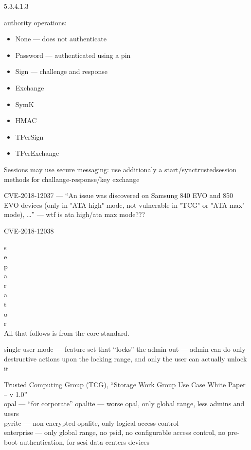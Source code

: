 \documentclass[
  digital, %
  oneside, %
  nolof,     %
  nolot,     %
]{fithesis4}
\begin{document}
5.3.4.1.3

authority operations: 
\begin{itemize}
    \item None --- does not authenticate
    \item Password --- authenticated using a pin
    \item Sign --- challenge and response
    \item Exchange
    \item SymK
    \item HMAC
    \item TPerSign
    \item TPerExchange
\end{itemize}

Sessions may use secure messaging: 
use additionaly a start/synctrustedsession methods for challange-response/key exchange

CVE-2018-12037  --- ``An issue was discovered on Samsung 840 EVO and 850 EVO devices (only in "ATA high" mode, not vulnerable in "TCG" or "ATA max" mode), \dots'' --- wtf is ata high/ata max mode???

CVE-2018-12038


s \\
e \\
p \\
a \\
r \\
a \\
t \\
o \\
r \\



All that follows is from the core standard\cite{tcg-storage-core}.


single user mode --- feature set that ``locks'' the admin out --- admin can do only destructive actions upon the locking range, and only the user can actually unlock it




Trusted Computing Group (TCG), “Storage Work Group Use Case White Paper – v 1.0” \\
opal --- ``for corporate''
opalite --- worse opal, only global range, less admins and uesrs \\
pyrite --- non-encrypted opalite, only logical access control \\
enterprise --- only global range, no psid, no configurable access control, no pre-boot authentication, for scsi data centers devices
\end{document}
